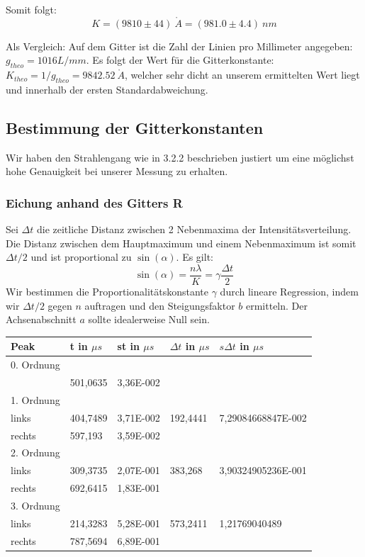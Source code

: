 Somit folgt: $$\boxed{K=(9810 \pm 44) \ \mathring A = (981.0 \pm 4.4) \ nm}$$

Als Vergleich: Auf dem Gitter ist die Zahl der Linien pro Millimeter angegeben: \\ $g_{theo}=1016 L/mm$. Es folgt der Wert f\"ur die Gitterkonstante: $K_{theo} = 1/g_{theo} = 9842.52 \ \mathring A$, welcher sehr dicht an unserem ermittelten Wert liegt und innerhalb der ersten Standardabweichung.

\subsection{Bestimmung der Gitterkonstanten}

Wir haben den Strahlengang wie in 3.2.2 beschrieben justiert um eine m\"oglichst hohe Genauigkeit bei unserer Messung zu erhalten.

\subsubsection{Eichung anhand des Gitters R}

Sei $\Delta t$ die zeitliche Distanz zwischen 2 Nebenmaxima der Intensit\"atsverteilung. Die Distanz zwischen dem Hauptmaximum und einem Nebenmaximum ist somit $\Delta t/2$ und ist proportional zu $\sin(\alpha)$. Es gilt: $$\sin(\alpha) = \frac{n\lambda}{K} = \gamma \frac{\Delta t}{2}$$
Wir bestimmen die Proportionalit\"atskonstante $\gamma$ durch lineare Regression, indem wir $\Delta t/2$ gegen $n$ auftragen und den Steigungsfaktor $b$ ermitteln. Der Achsenabschnitt $a$ sollte idealerweise Null sein.

\begin{center}
\begin{tabular}{lllll}
\toprule
Peak & t in $\mu s$ & st in $\mu s$ & $\Delta t$ in $\mu s$ & $s\Delta t$ in $\mu s$ \\
\midrule
0. Ordnung \\
 & 501,0635 & 3,36E-002\\
\midrule
1. Ordnung\\
links & 404,7489 & 3,71E-002 & 192,4441 & 7,29084668847E-002\\
rechts & 597,193 & 3,59E-002\\
\midrule
2. Ordnung\\ 
links & 309,3735 & 2,07E-001 & 383,268 & 3,90324905236E-001\\
rechts & 692,6415 & 1,83E-001\\
\midrule
3. Ordnung\\ 
links & 214,3283 & 5,28E-001 & 573,2411 & 1,21769040489\\
rechts & 787,5694 & 6,89E-001\\
\bottomrule
\end{tabular}
\end{center}


